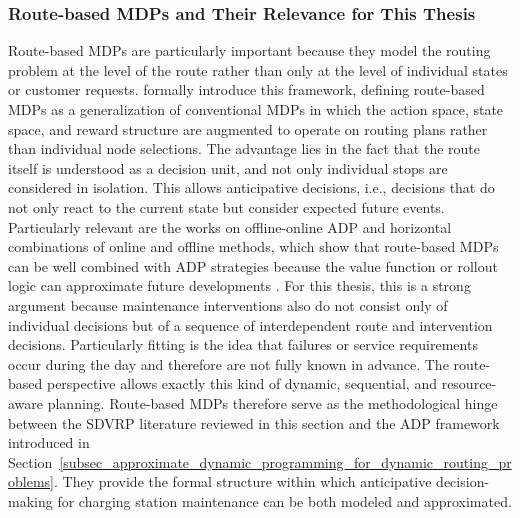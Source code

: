 \documentclass[12pt,oneside]{article}
\begin{document}
\subsubsection{Route-based MDPs and Their Relevance for This Thesis}
Route-based MDPs are particularly important because they model the routing problem at the level of the route rather than only at the level of individual states or customer requests. \citet{ulmer2020modeling} formally introduce this framework, defining route-based MDPs as a generalization of conventional MDPs in which the action space, state space, and reward structure are augmented to operate on routing plans rather than individual node selections. The advantage lies in the fact that the route itself is understood as a decision unit, and not only individual stops are considered in isolation.
This allows anticipative decisions, i.e., decisions that do not only react to the current state but consider expected future events. Particularly relevant are the works on offline-online ADP and horizontal combinations of online and offline methods, which show that route-based MDPs can be well combined with ADP strategies because the value function or rollout logic can approximate future developments \citep{ulmer2020horizontal}.
For this thesis, this is a strong argument because maintenance interventions also do not consist only of individual decisions but of a sequence of interdependent route and intervention decisions. Particularly fitting is the idea that failures or service requirements occur during the day and therefore are not fully known in advance. The route-based perspective allows exactly this kind of dynamic, sequential, and resource-aware planning.
Route-based MDPs therefore serve as the methodological hinge between the SDVRP literature reviewed in this section and the ADP framework introduced in Section~\ref{subsec_approximate_dynamic_programming_for_dynamic_routing_problems}. They provide the formal structure within which anticipative decision-making for charging station maintenance can be both modeled and approximated.
\end{document}
